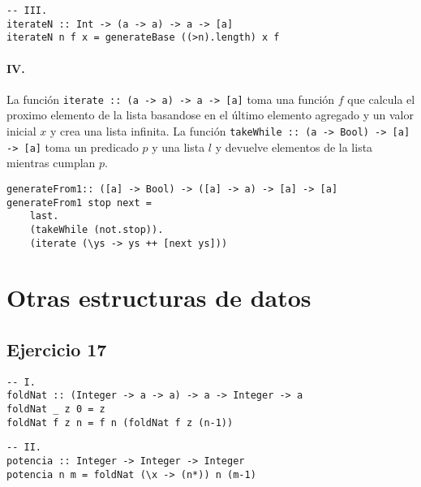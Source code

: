 \documentclass[10pt,a4paper]{article}
\begin{document}
\begin{centrado}
    \begin{verbatim}
-- III.
iterateN :: Int -> (a -> a) -> a -> [a]
iterateN n f x = generateBase ((>n).length) x f
    \end{verbatim}
\end{centrado}

\paragraph{IV.} La función \texttt{iterate :: (a -> a) -> a -> [a]} toma una función $f$ que calcula el proximo elemento de la lista basandose en el último elemento agregado y un valor inicial $x$ y crea una lista infinita. La función \texttt{takeWhile :: (a -> Bool) -> [a] -> [a]} toma un predicado $p$ y una lista $l$ y devuelve elementos de la lista mientras cumplan $p$.

\begin{centrado}
    \begin{verbatim}
generateFrom1:: ([a] -> Bool) -> ([a] -> a) -> [a] -> [a]
generateFrom1 stop next = 
    last.
    (takeWhile (not.stop)).
    (iterate (\ys -> ys ++ [next ys]))
    \end{verbatim}
\end{centrado}

\section*{Otras estructuras de datos}
\subsection{Ejercicio 17}
\begin{centrado}
    \begin{verbatim}
-- I.
foldNat :: (Integer -> a -> a) -> a -> Integer -> a
foldNat _ z 0 = z
foldNat f z n = f n (foldNat f z (n-1))
\end{verbatim}
\end{centrado}

\begin{centrado}
    \begin{verbatim}
-- II.
potencia :: Integer -> Integer -> Integer
potencia n m = foldNat (\x -> (n*)) n (m-1)
    \end{verbatim}
\end{centrado}
\end{document}
